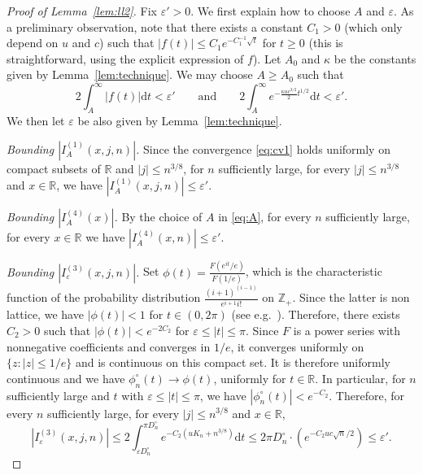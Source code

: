 \documentclass[11pt]{article}
\theoremstyle{definition}
\numberwithin{equation}{section}
\numberwithin{figure}{section}
\numberwithin{table}{section}
\newcommand{\Z}{\mathbb{Z}}
\newcommand{\R}{\mathbb{R}}
\def\phicn{\phi^{\circ}_{n}}
\def\Dcn{D^{\circ}_{n}}
\renewcommand{\epsilon}{\varepsilon}
\begin{document}
\begin{proof}[Proof of Lemma~\ref{lem:ll2}]
Fix $\epsilon'>0$. We first explain how to choose $A$ and $\epsilon$.
As a preliminary observation, note that there exists a constant $C_{1}>0$
(which only depend on $u$ and $c$) such that $|f(t)| \leq C_{1} e^{-C_{1}^{-1} \sqrt{t}}$ for $t \geq 0$
(this is straightforward, using the explicit expression of $f$).
Let $A_{0}$ and $\kappa$ be the constants given by Lemma~\ref{lem:technique}.
We may choose $A \geq A_{0}$ such that
\begin{equation}
\label{eq:A}2\int_{A}^{\infty} |f(t)|  \mathrm{d}t <\epsilon' \qquad \textrm{and} \qquad  2 \int_{A}^{\infty} e^{- \frac{\kappa u c^{3/2}}{2} t^{1/2}} \mathrm{d}t < \epsilon'.
\end{equation}
We then let $\epsilon$ be also given by Lemma~\ref{lem:technique}.






\emph{Bounding $|I^{(1)}_{A}(x,j,n)|$.} Since the convergence \eqref{eq:cv1} holds  uniformly on compact subsets of $\R$ and $|j| \leq n^{3/8}$, for   $n$ sufficiently large, for every $|j| \leq n^{3/8}$ and $x \in \R$, we have $|I^{(1)}_{A}(x,j,n)| \leq \epsilon'$.

\emph{Bounding $|I^{(4)}_{A}(x)|$.} By the choice of $A$ in \eqref{eq:A}, for every $n$ sufficiently large, for every $x \in \R$ we have $|I^{(4)}_{A}(x,n)| \leq \epsilon'$.

\emph{Bounding $|I^{(3)}_{\epsilon}(x,j,n)|$.}  Set $\phi(t)=\frac{F(e^{it}/e)}{F(1/e)}$, which is the characteristic function of  the probability distribution $ \frac{(i+1)^{(i-1)}}{e^{i+1} i!}$ on $\Z_{+}$. Since the latter is non lattice, we have $|\phi(t)|<1$ for $t \in (0,2\pi)$ (see e.g.~\cite[Theorem 3.5.1]{Dur10}).
Therefore, there exists $C_2>0$ such that $|\phi(t)|<e^{-2C_2}$ for $ \epsilon \leq |t| \leq \pi$.
Since $F$ is a power series with nonnegative coefficients and converges in $1/e$,
it converges uniformly on $\{z: |z| \le 1/e\}$ and is continuous on this compact set.
It is therefore uniformly continuous and
we have $\phicn(t) \rightarrow \phi(t)$, uniformly for $t \in \R$.
In particular, for $n$ sufficiently large and $t$ with $ \epsilon \leq |t| \leq \pi$,
we have $|\phicn(t)|<e^{-C_2}$.
 Therefore, for every $n$ sufficiently large, for every $|j| \leq n^{3/8}$ and  $x \in \R$,
 \[ \left|I^{(3)}_{\epsilon}(x,j,n) \right|  \leq 2 \int_{\epsilon \Dcn}^{\pi \Dcn} e^{-C_2 (uK_{n}  +n^{3/8})} \mathrm{d}t
 \leq 2 \pi \Dcn \cdot (e^{- C_2 u c \sqrt{n}/2} ) \le \epsilon'.\]


\end{proof}
\end{document}

